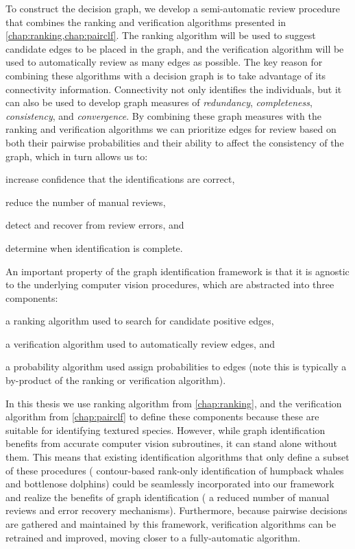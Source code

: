 To construct the decision graph, we develop a semi-automatic review procedure that combines the ranking and
  verification algorithms presented in \cref{chap:ranking,chap:pairclf}.
The ranking algorithm will be used to suggest candidate edges to be placed in the graph, and the verification
  algorithm will be used to automatically review as many edges as possible.
The key reason for combining these algorithms with a decision graph is to take advantage of its connectivity
  information.
Connectivity not only identifies the individuals, but it can also be used to develop graph measures of
  \emph{redundancy}, \emph{completeness}, \emph{consistency}, and \emph{convergence}.
By combining these graph measures with the ranking and verification algorithms we can prioritize edges for review
  based on both their pairwise probabilities and their ability to affect the consistency of the graph, which in
  turn allows us to:
\begin{enumin}
\item increase confidence that the identifications are correct, %
\item reduce the number of manual reviews,  %
\item detect and recover from review errors, and %
\item determine when identification is complete. %
\end{enumin}

An important property of the graph identification framework is that it is agnostic to the underlying computer
  vision procedures, which are abstracted into three components:
\begin{enumin}
\item a ranking algorithm used to search for candidate positive edges, %
\item a verification algorithm used to automatically review edges, and %
\item a probability algorithm used assign probabilities to edges (note this is typically a by-product of the
  ranking or verification algorithm).
\end{enumin}
In this thesis we use ranking algorithm from \cref{chap:ranking}, and the verification algorithm from
  \cref{chap:pairclf} to define these components because these are suitable for identifying textured species.
However, while graph identification benefits from accurate computer vision subroutines, it can stand alone
  without them.
This means that existing identification algorithms that only define a subset of these procedures (\eg{}
  contour-based rank-only identification of humpback whales and bottlenose dolphins) could be seamlessly
  incorporated into our framework and realize the benefits of graph identification (\eg{} a reduced number of
  manual reviews and error recovery mechanisms).
Furthermore, because pairwise decisions are gathered and maintained by this framework, verification algorithms
  can be retrained and improved, moving closer to a fully-automatic algorithm.


